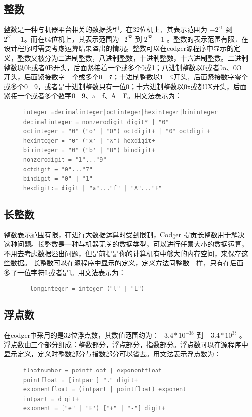 \subsection{整数}
整数是一种与机器平台相关的数据类型，在32位机上，其表示范围为 $-2^{31}$ 到 $2^{31}-1$。而在64位机上，其表示范围为$-2^{63}$ 到 $2^{63}-1$ 。整数的表示范围有限，在设计程序时需要考虑运算结果溢出的情况。整数可以在codger源程序中显示的定义，整数又被分为二进制整数，八进制整数，十进制整数，十六进制整数。二进制整数以0b或者0B开头，后面紧接着一个或多个0或1；八进制整数以0或者0o、0O开头，后面紧接数字一个或多个0－7；十进制整数以1－9开头，后面紧接数字零个或多个0－9，或者是十进制整数只有一位0；十六进制整数以0x或都0X开头，后面紧接一个或者多个数字0－9、a－f、A－F。用文法表示为：
\begin{quote}
\begin{verbatim}
integer =decimalinteger|octinteger|hexinteger|bininteger
decimalinteger = nonzerodigit digit* | "0"
octinteger = "0" ("o" | "O") octdigit+ | "0" octdigit+
hexinteger = "0" ("x" | "X") hexdigit+
bininteger = "0" ("b" | "B") bindigit+
nonzerodigit = "1"..."9"
octdigit = "0"..."7"
bindigit = "0" | "1"
hexdigit:= digit | "a"..."f" | "A"..."F"
\end{verbatim}
\end{quote}

\subsection{长整数}
整数表示范围有限，在进行大数据运算时受到限制，Codger 提贡长整数用于解决这种问题。长整数是一种与机器无关的数据类型，可以进行任意大小的数据运算，不用去考虑数据溢出问题，但是前提是你的计算机有中够大的内存空间，来保存这些数据。 长整数可以在源程序中显示的定义，定义方法同整数一样，只有在后面多了一位字符L或者是l。用文法表示为：
\begin{quote}
 \begin{verbatim}
  longinteger = integer ("l" | "L")
 \end{verbatim}
\end{quote}

\subsection{浮点数}
在codger中采用的是32位浮点数，其数值范围约为：$-3.4*10^{-38}$ 到 $-3.4*10^{38}$ 。浮点数由三个部分组成：整数部分，浮点部分，指数部分。浮点数可以在源程序中显示定义，定义时整数部分与指数部分可以省去。用文法表示浮点数为：
\begin{quote}
 \begin{verbatim}
floatnumber = pointfloat | exponentfloat
pointfloat = [intpart] "." digit+
exponentfloat = (intpart | pointfloat) exponent
intpart = digit+
exponent = ("e" | "E") ["+" | "-"] digit+
 \end{verbatim}
\end{quote}

